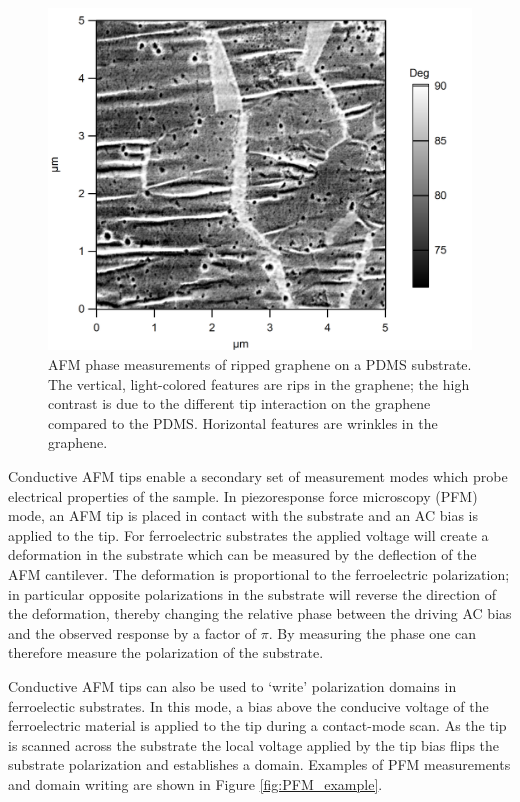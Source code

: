 \documentclass[edeposit,fullpage,draftthesis]{uiucthesis2009}
\begin{document}
         \begin{figure}
            \centering
            \includegraphics[width=0.5\linewidth]{images/experimentaltechniques/AFMrips.png}
            \caption[AFM micrograph of ripped graphene]{
                AFM phase measurements of ripped graphene on a PDMS substrate. The vertical, light-colored
                features are rips in the graphene; the high contrast is due to the different tip 
                interaction on the graphene compared to the PDMS. Horizontal features are wrinkles
                in the graphene.
                }
            \label{fig:afm_rips}
        \end{figure}
       
        Conductive AFM tips enable a secondary set of measurement modes which probe electrical properties of the sample.
        In piezoresponse force microscopy (PFM) mode, an AFM tip is placed in contact with the substrate
        and an AC bias is applied to the tip. For ferroelectric substrates the applied voltage
        will create a deformation in the substrate which can be measured by the deflection of the AFM cantilever. 
        The deformation is proportional to the ferroelectric polarization; in particular opposite polarizations in the substrate
        will reverse the direction of the deformation, thereby changing the relative phase between the driving AC bias
        and the observed response by a factor of $\pi$. By measuring the phase one can therefore measure
        the polarization of the substrate. 
        
        Conductive AFM tips can also be used to `write' polarization domains in ferroelectic substrates.
        In this mode, a bias above the conducive voltage of the ferroelectric material is applied to the tip 
        during a contact-mode scan. As the tip is scanned across the substrate the local voltage applied by the 
        tip bias flips the substrate polarization and establishes a domain.
        Examples of PFM measurements and domain writing are shown in Figure \ref{fig:PFM_example}.
        
\end{document}
